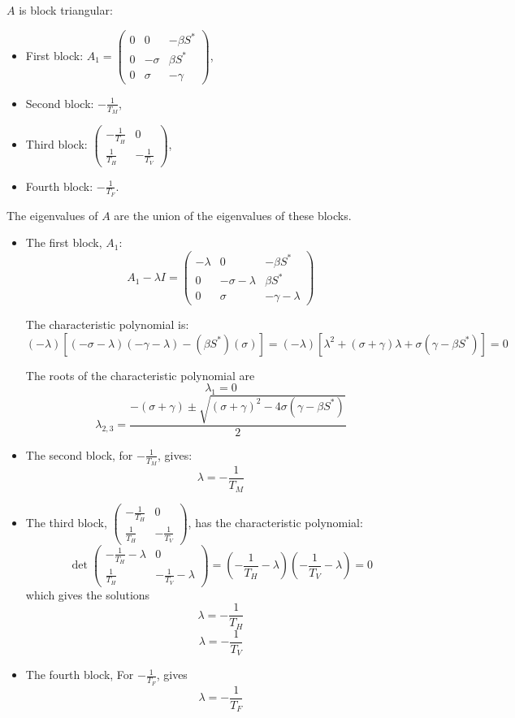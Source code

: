 \documentclass[11pt]{article}
\begin{document}
$A$ is block triangular:

\begin{itemize}
    

\item First block: $A_1 = \begin{pmatrix} 0 & 0 & -\beta S^* \\ 0 & -\sigma & \beta S^* \\ 0 & \sigma & -\gamma \end{pmatrix}$,
\item Second block: $-\frac{1}{T_M}$,
\item Third block: $\begin{pmatrix} -\frac{1}{T_H} & 0 \\ \frac{1}{T_H} & -\frac{1}{T_V} \end{pmatrix}$,
\item Fourth block: $-\frac{1}{T_F}$.
\end{itemize}

The eigenvalues of $A$ are the union of the eigenvalues of these blocks.
\begin{itemize}
    \item The first block, $A_1$:
$$A_1 - \lambda I = \begin{pmatrix}
-\lambda & 0 & -\beta S^* \\
0 & -\sigma - \lambda & \beta S^* \\
0 & \sigma & -\gamma - \lambda
\end{pmatrix}$$

The characteristic polynomial is:  
$$(-\lambda) [ (-\sigma - \lambda)(-\gamma - \lambda) - (\beta S^*)(\sigma) ] = (-\lambda) [ \lambda^2 + (\sigma + \gamma) \lambda + \sigma (\gamma - \beta S^*) ] = 0$$

The roots of the characteristic polynomial are
$$\lambda_1 = 0$$
$$\lambda_{2,3} = \frac{-(\sigma + \gamma) \pm \sqrt{(\sigma + \gamma)^2 - 4 \sigma (\gamma - \beta S^*)}}{2}$$


\item The second block, for $-\frac{1}{T_M}$, gives:
$$\lambda = -\frac{1}{T_M}$$


\item The third block, $\begin{pmatrix} -\frac{1}{T_H} & 0 \\ \frac{1}{T_H} & -\frac{1}{T_V} \end{pmatrix}$, has the characteristic polynomial:
$$\det \begin{pmatrix} -\frac{1}{T_H} - \lambda & 0 \\ \frac{1}{T_H} & -\frac{1}{T_V} - \lambda \end{pmatrix} = (-\frac{1}{T_H} - \lambda)(-\frac{1}{T_V} - \lambda) = 0$$
which gives the solutions
$$\lambda = -\frac{1}{T_H}$$
$$\lambda = -\frac{1}{T_V}$$


\item The fourth block, For $-\frac{1}{T_F}$, gives 
$$\lambda = -\frac{1}{T_F}$$
\end{itemize}
\end{document}
